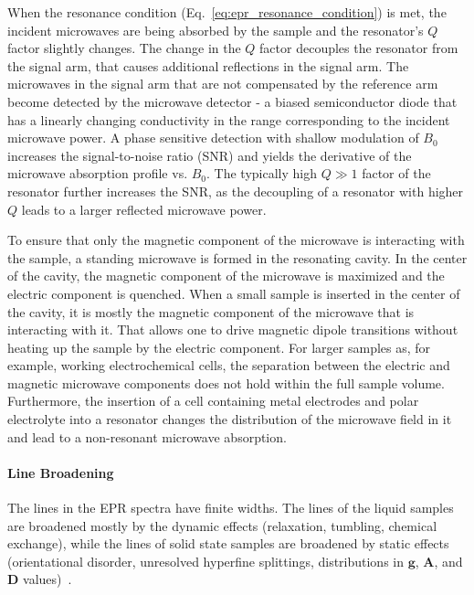 \par
When the resonance condition (Eq.~\ref{eq:epr_resonance_condition}) is met, the incident microwaves are being absorbed by the sample and the resonator's $Q$ factor slightly changes. The change in the $Q$ factor decouples the resonator from the signal arm, that causes additional reflections in the signal arm. The microwaves in the signal arm that are not compensated by the reference arm become detected by the microwave detector - a biased semiconductor diode that has a linearly changing conductivity in the range corresponding to the incident microwave power. A phase sensitive detection with shallow modulation of $B_0$ increases the signal-to-noise ratio (SNR) and yields the derivative of the microwave absorption profile vs. $B_0$. The typically high $Q\gg1$ factor of the resonator further increases the SNR, as the decoupling of a resonator with higher $Q$ leads to a larger reflected microwave power.

\par
To ensure that only the magnetic component of the microwave is interacting with the sample, a standing microwave is formed in the resonating cavity. In the center of the cavity, the magnetic component of the microwave is maximized and the electric component is quenched. When a small sample is inserted in the center of the cavity, it is mostly the magnetic component of the microwave that is interacting with it. That allows one to drive magnetic dipole transitions without heating up the sample by the electric component. For larger samples as, for example, working electrochemical cells, the separation between the electric and magnetic microwave components does not hold within the full sample volume. Furthermore, the insertion of a cell containing metal electrodes and polar electrolyte into a resonator changes the distribution of the microwave field in it and lead to a non-resonant microwave absorption.


\paragraph{Line Broadening}
The lines in the EPR spectra have finite widths. The lines of the liquid samples are broadened mostly by the dynamic effects (relaxation, tumbling, chemical exchange), while the lines of solid state samples are broadened by static effects (orientational disorder, unresolved hyperfine splittings, distributions in $\textbf{g}$, $\textbf{A}$, and $\textbf{D}$ values)~\cite{Stoll2006}.\\

